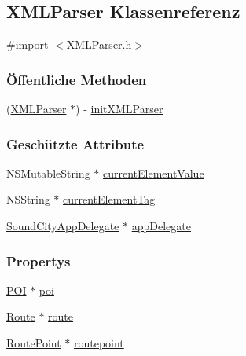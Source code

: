 \hypertarget{interface_x_m_l_parser}{
\subsection{XMLParser Klassenreferenz}
\label{interface_x_m_l_parser}
}


{\ttfamily \#import $<$XMLParser.h$>$}\subsubsection*{Öffentliche Methoden}
\begin{DoxyCompactItemize}
\item 
(\hyperlink{interface_x_m_l_parser}{XMLParser} $\ast$) -\/ \hyperlink{interface_x_m_l_parser_a04ecc0246851bd683dc7eadbf98f5771}{initXMLParser}
\end{DoxyCompactItemize}
\subsubsection*{Geschützte Attribute}
\begin{DoxyCompactItemize}
\item 
NSMutableString $\ast$ \hyperlink{interface_x_m_l_parser_ae31fe02f91fbc14d7b81a19070f56415}{currentElementValue}
\item 
NSString $\ast$ \hyperlink{interface_x_m_l_parser_a5a17b627330be2bd38d3d5ad5880e0cc}{currentElementTag}
\item 
\hyperlink{interface_sound_city_app_delegate}{SoundCityAppDelegate} $\ast$ \hyperlink{interface_x_m_l_parser_a51da78288f2a6e119a96f273b24d4fc8}{appDelegate}
\end{DoxyCompactItemize}
\subsubsection*{Propertys}
\begin{DoxyCompactItemize}
\item 
\hyperlink{interface_p_o_i}{POI} $\ast$ \hyperlink{interface_x_m_l_parser_ae1b4a0d3701b655822e78f0040c67bae}{poi}
\item 
\hyperlink{interface_route}{Route} $\ast$ \hyperlink{interface_x_m_l_parser_a2ad7a3d5bcecc04fbcf3ff1a1094c481}{route}
\item 
\hyperlink{interface_route_point}{RoutePoint} $\ast$ \hyperlink{interface_x_m_l_parser_addd4c6bb09826b9635e863dd6b24eb04}{routepoint}
\end{DoxyCompactItemize}


